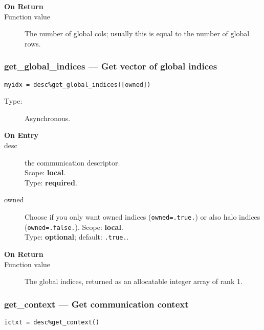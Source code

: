 \begin{description}
\item[\bf On Return]
\item[Function value] The number of global cols; usually this is equal
  to the number of global rows. 
\end{description}


\subsubsection*{get\_global\_indices --- Get vector of global indices}

\begin{verbatim}
myidx = desc%get_global_indices([owned])
\end{verbatim}

\begin{description}
\item[Type:] Asynchronous.
\item[\bf On Entry]
\item[desc] the communication descriptor.\\
Scope: {\bf local}.\\
Type: {\bf required}.\\
\item[owned] Choose if you only want owned indices
  (\verb|owned=.true.|) or also halo indices (\verb|owned=.false.|). 
Scope: {\bf local}.\\
Type: {\bf optional}; default: \verb|.true.|.\\
\end{description}

\begin{description}
\item[\bf On Return]
\item[Function value] The global indices, returned as an allocatable
  integer array of rank 1. 
\end{description}



\subsubsection*{get\_context --- Get communication context}

\begin{verbatim}
ictxt = desc%get_context()
\end{verbatim}

